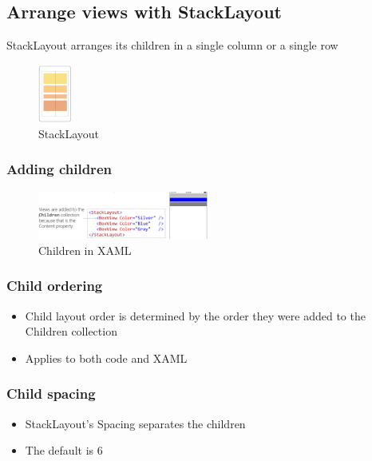 \documentclass{article}
\begin{document}
\subsection{Arrange views with StackLayout}

StackLayout arranges its children in a single column or a single row

\begin{figure}[H]
    \centering
    \includegraphics[width=0.1\textwidth]{xaml-stacklayout.png}
    \caption{StackLayout}
\end{figure}


\subsubsection{Adding children}

\begin{figure}[H]
    \centering
    \includegraphics[width=0.5\textwidth]{xaml-stacklayout-children.png}
    \caption{Children in XAML}
\end{figure}

\subsubsection{Child ordering}

\begin{itemize}
    \item Child layout order is determined by the order they were added to the Children collection
    \item Applies to both code and XAML
\end{itemize}

\subsubsection{Child spacing}

\begin{itemize}
    \item StackLayout's Spacing separates the children
    \item The default is 6
\end{itemize}
\end{document}
